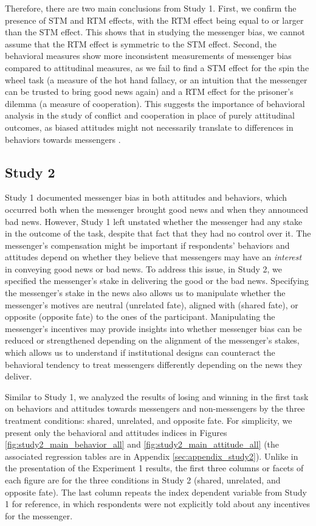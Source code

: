 Therefore, there are two main conclusions from Study 1. First, we confirm
the presence of STM and RTM effects, with the RTM effect being equal to
or larger than the STM effect. This shows that in studying the messenger
bias, we cannot assume that the RTM effect is symmetric to the STM
effect. Second, the behavioral measures show more inconsistent
measurements of messenger bias compared to attitudinal measures, as
we fail to find a STM effect for the spin the wheel task (a measure of the hot hand fallacy, or an intuition that the messenger can be trusted to bring good news again) and a
RTM effect for the prisoner's dilemma (a measure of cooperation). This suggests the
importance of behavioral analysis in the study of conflict and
cooperation in place of purely attitudinal outcomes, as biased attitudes
might not necessarily translate to differences in behaviors towards
messengers \citep{del2020behavioral, ostrom1998behavioral}.

\subsection{Study 2}

Study 1 documented messenger bias in both attitudes and behaviors,
which occurred both when the messenger brought good news and when they
announced bad news. However, Study 1 left unstated whether the messenger
had any stake in the outcome of the task, despite that fact that they
had no control over it. The messenger's compensation might be important
if respondents' behaviors and attitudes depend on whether they believe that
messengers may have an \emph{interest} in conveying good news or bad
news. To address this issue, in Study 2, we specified the messenger's
stake in delivering the good or the bad news. Specifying the messenger's
stake in the news also allows us to manipulate whether the messenger's
motives are neutral (unrelated fate), aligned with (shared fate), or
opposite (opposite fate) to the ones of the participant. Manipulating
the messenger's incentives may provide insights into whether
messenger bias can be reduced or strengthened depending on the alignment
of the messenger's stakes, which allows us to understand if
institutional designs can counteract the behavioral tendency to treat
messengers differently depending on the news they deliver.

Similar to Study 1, we analyzed the results of losing and winning in the first
task on behaviors and attitudes towards messengers and non-messengers by the
three treatment conditions: shared, unrelated, and opposite fate. For simplicity,
we present only the behavioral and attitudes indices in Figures \ref{fig:study2_main_behavior_all} 
and \ref{fig:study2_main_attitude_all} (the associated
regression tables are in Appendix \ref{sec:appendix_study2}). Unlike in the
presentation of the Experiment 1 results, the first three columns or facets of
each figure are for the three conditions in Study 2 (shared, unrelated, and
opposite fate). The last column repeats the index dependent variable from Study
1 for reference, in which respondents were not explicitly told about any
incentives for the messenger.

